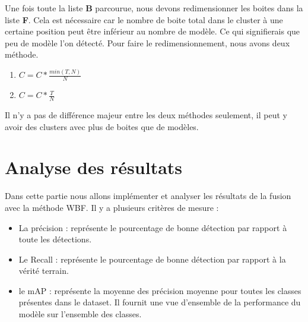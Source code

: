 \documentclass{article}
\begin{document}
Une fois toute la liste \textbf{B} parcourue, nous devons redimensionner les boites dans la liste \textbf{F}. Cela est nécessaire car le nombre de boite total dans le cluster à une certaine position peut être inférieur au nombre de modèle. Ce qui signifierais que peu de modèle l'on détecté. Pour faire le redimensionnement, nous avons deux méthode. 
\begin{enumerate}
    \item \(C = C * \frac{min(T,N)}{N}\)
    \item  \(C = C * \frac{T}{N}\)
\end{enumerate}

Il n'y a pas de différence majeur entre les deux méthodes seulement, il peut y avoir des clusters avec plus de boites que de modèles.

\section{Analyse des résultats}

Dans cette partie nous allons implémenter et analyser les résultats de la fusion avec la méthode WBF. 
Il y a plusieurs critères de mesure : 
\begin{itemize}
    \item La précision : représente le pourcentage de bonne détection par rapport à toute les détections.
    \item Le Recall : représente le pourcentage de bonne détection par rapport à la vérité terrain.
    \item le mAP : représente la moyenne des précision moyenne pour toutes les classes présentes dans le dataset. Il fournit une vue d'ensemble de la performance du modèle sur l'ensemble des classes.
\end{itemize}
\end{document}
